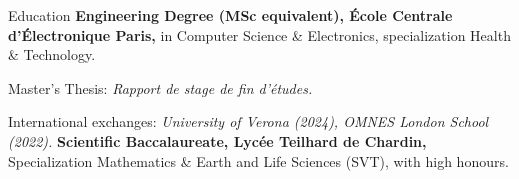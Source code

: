\begin{rubric}{Education}
\entry*[2020 -- 2025]%
	\textbf{Engineering Degree (MSc equivalent), École Centrale d'Électronique Paris,} in Computer Science \& Electronics, specialization Health \& Technology.\par
	Master's Thesis: \emph{Rapport de stage de fin d'études.} \par
	International exchanges: \emph{University of Verona (2024), OMNES London School (2022).}
\entry*[2017 -- 2020]%
	\textbf{Scientific Baccalaureate, Lycée Teilhard de Chardin,} Specialization Mathematics \& Earth and Life Sciences (SVT), with high honours.
\end{rubric}